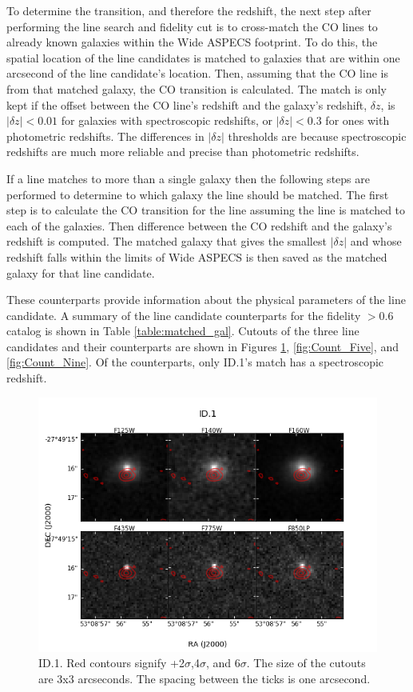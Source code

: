 To determine the transition, and therefore the redshift, the next step after performing the line search and fidelity cut is to cross-match the CO lines to already known galaxies within the Wide ASPECS footprint. To do this, the spatial location of the line candidates is matched to galaxies that are within one arcsecond of the line candidate's location. Then, assuming that the CO line is from that matched galaxy, the CO transition is calculated. The match is only kept if the offset between the CO line's redshift and the galaxy's redshift, $\delta z$, is $|\delta z| < 0.01$ for galaxies with spectroscopic redshifts, or $|\delta z| < 0.3$ for ones with photometric redshifts. The differences in $|\delta z|$ thresholds are because spectroscopic redshifts are much more reliable and precise than photometric redshifts. 

If a line matches to more than a single galaxy then the following steps are performed to determine to which galaxy the line should be matched. The first step is to calculate the CO transition for the line assuming the line is matched to each of the galaxies. Then difference between the CO redshift and the galaxy's redshift is computed. The matched galaxy that gives the smallest $|\delta z|$ and whose redshift falls within the limits of Wide ASPECS is then saved as the matched galaxy for that line candidate. 

These counterparts provide information about the physical parameters of the line candidate. A summary of the line candidate counterparts for the fidelity $>$0.6 catalog is shown in Table \ref{table:matched_gal}. Cutouts of the three line candidates and their counterparts are shown in Figures \ref{fig:Count_One}, \ref{fig:Count_Five}, and \ref{fig:Count_Nine}. Of the counterparts, only ID.1's match has a spectroscopic redshift.

\begin{figure}[!htbp]
\centering \includegraphics[width=120mm]{Matched/ASPECS_Cutout_0.png}
\caption{ID.1. Red contours signify +2$\sigma$,4$\sigma$, and 6$\sigma$. The size of the cutouts are 3x3 arcseconds. The spacing between the ticks is one arcsecond.}
\label{fig:Count_One}
\end{figure}

